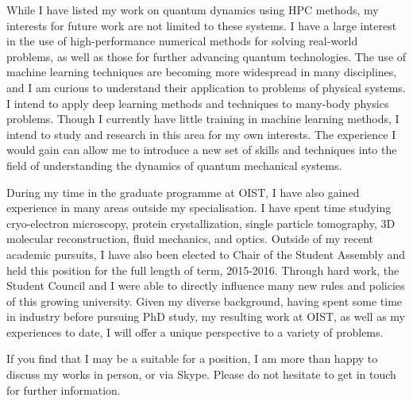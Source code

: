 \documentclass[12pt,a4paper,unicode]{moderncv}
\begin{document}
{    While I have listed my work on quantum dynamics using HPC methods, my interests for future work are not limited to these systems. I have a large interest in the use of high-performance numerical methods for solving real-world problems, as well as those for further advancing quantum technologies. The use of machine learning techniques are becoming more widespread in many disciplines, and I am curious to understand their application to problems of physical systems. I intend to apply deep learning methods and techniques to many-body physics problems. Though I currently have little training in machine learning methods, I intend to study and research in this area for my own interests. The experience I would gain can allow me to introduce a new set of skills and techniques into the field of understanding the dynamics of quantum mechanical systems. %



    During my time in the graduate programme at OIST, I have also gained  experience in many areas outside my specialisation. I have spent time studying cryo-electron microscopy, protein crystallization, single particle tomography, 3D molecular reconstruction, fluid mechanics, and optics. Outside of my recent academic pursuits, I have also been elected to Chair of the Student Assembly and held this position for the full length of term, 2015-2016. Through hard work, the Student Council and I were able to directly influence many new rules and policies of this growing university. Given my diverse background, having spent some time in industry before pursuing PhD study, my resulting work at OIST, as well as my experiences to date, I will offer a unique perspective to a variety of problems.

    If you find that I may be a suitable for a position, I am more than happy to discuss my works in person, or via Skype. Please do not hesitate to get in touch for further information.
}

\makeletterclosing
\end{document}

